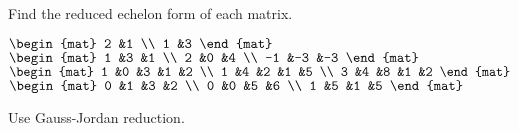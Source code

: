 \begin{exercises}
\begin{answer}
     \end{answer}
  \recommended \item 
    Find the reduced echelon form of each matrix.
    \begin{exparts*}
      \partsitem \( \begin{mat}
          2  &1  \\
          1  &3
        \end{mat}  \)
      \partsitem \( \begin{mat}
          1  &3  &1  \\
          2  &0  &4  \\
         -1  &-3 &-3
        \end{mat}  \)
      \partsitem \( \begin{mat}
          1  &0  &3  &1  &2  \\
          1  &4  &2  &1  &5  \\
          3  &4  &8  &1  &2
        \end{mat}  \)
      \partsitem \( \begin{mat}
          0  &1  &3  &2  \\
          0  &0  &5  &6  \\
          1  &5  &1  &5
        \end{mat}  \)
    \end{exparts*}
    \begin{answer}
      Use Gauss-Jordan reduction.
\end{answer}
\end{exercises}
